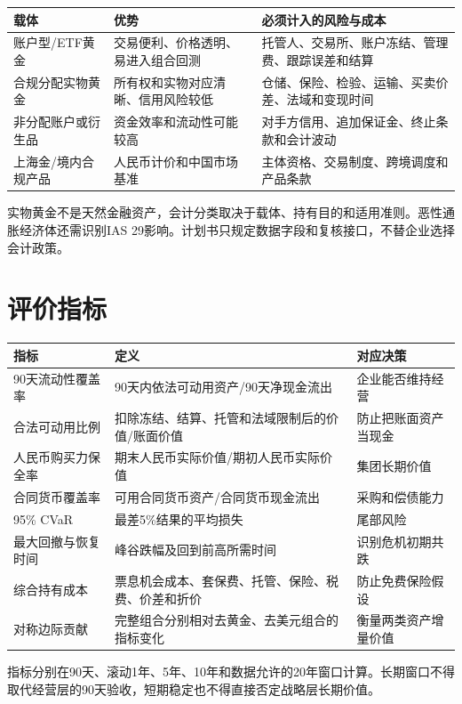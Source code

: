 \documentclass[UTF8,fontset=windows,12pt,openany]{ctexbook}
\begin{document}
\begin{longtable}{p{3.0cm}p{4.8cm}p{5.5cm}}
\toprule
\textbf{载体} & \textbf{优势} & \textbf{必须计入的风险与成本}\\
\midrule
账户型/ETF黄金 & 交易便利、价格透明、易进入组合回测 & 托管人、交易所、账户冻结、管理费、跟踪误差和结算\\
合规分配实物黄金 & 所有权和实物对应清晰、信用风险较低 & 仓储、保险、检验、运输、买卖价差、法域和变现时间\\
非分配账户或衍生品 & 资金效率和流动性可能较高 & 对手方信用、追加保证金、终止条款和会计波动\\
上海金/境内合规产品 & 人民币计价和中国市场基准 & 主体资格、交易制度、跨境调度和产品条款\\
\bottomrule
\end{longtable}

实物黄金不是天然金融资产，会计分类取决于载体、持有目的和适用准则\cite{ifrscommodity}。恶性通胀经济体还需识别IAS 29影响\cite{ifrsias29}。计划书只规定数据字段和复核接口，不替企业选择会计政策。

\section{评价指标}

\begin{longtable}{p{3.4cm}p{6.2cm}p{3.7cm}}
\toprule
\textbf{指标} & \textbf{定义} & \textbf{对应决策}\\
\midrule
90天流动性覆盖率 & 90天内依法可动用资产/90天净现金流出 & 企业能否维持经营\\
合法可动用比例 & 扣除冻结、结算、托管和法域限制后的价值/账面价值 & 防止把账面资产当现金\\
人民币购买力保全率 & 期末人民币实际价值/期初人民币实际价值 & 集团长期价值\\
合同货币覆盖率 & 可用合同货币资产/合同货币现金流出 & 采购和偿债能力\\
95\% CVaR & 最差5\%结果的平均损失 & 尾部风险\\
最大回撤与恢复时间 & 峰谷跌幅及回到前高所需时间 & 识别危机初期共跌\\
综合持有成本 & 票息机会成本、套保费、托管、保险、税费、价差和折价 & 防止免费保险假设\\
对称边际贡献 & 完整组合分别相对去黄金、去美元组合的指标变化 & 衡量两类资产增量价值\\
\bottomrule
\end{longtable}

指标分别在90天、滚动1年、5年、10年和数据允许的20年窗口计算。长期窗口不得取代经营层的90天验收，短期稳定也不得直接否定战略层长期价值。
\end{document}
